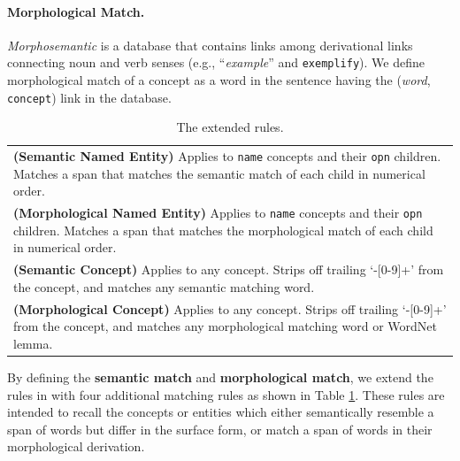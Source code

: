 \documentclass[11pt,a4paper]{article}
\begin{document}
\paragraph{Morphological Match.} \textit{Morphosemantic} is a 
database that contains links among derivational links connecting
noun and verb senses (e.g., ``{\it example}'' and {\tt exemplify}).
We define morphological match of a concept as a word in the sentence 
having the ({\it word}, \texttt{concept}) link in the database.

\begin{table}[t]
	\centering
	\small
	\begin{tabular}{p{}}
		{\bf (Semantic Named Entity)} Applies to {\tt name} concepts and
		their {\tt opn} children. Matches a span that matches 
		the semantic match of each child in numerical order.\\[0.3em]
		{\bf (Morphological Named Entity)} Applies to {\tt name} concepts and
		their {\tt opn} children. Matches a span that matches 
		the morphological match of each child in numerical order.\\[0.3em]
		{\bf (Semantic Concept)} Applies to any concept. 
		Strips off trailing `-[0-9]+' from the concept,
		and matches any semantic matching word. \\[0.3em]
		{\bf (Morphological Concept)} Applies to any concept. 
		Strips off trailing `-[0-9]+' from the concept,
		and matches any morphological matching word or WordNet lemma. \\
	\end{tabular}
	\caption{The extended rules.} \label{tbl:extend-rules}
\end{table}
By defining the {\bf semantic match} and {\bf morphological match},
we extend the rules in \citet{flanigan-EtAl:2014:P14-1} with four
additional matching rules as shown in Table \ref{tbl:extend-rules}.
These rules are intended to recall the concepts or entities which
either semantically resemble a span of words but differ in the surface form,
or match a span of words in their morphological derivation.
\end{document}
